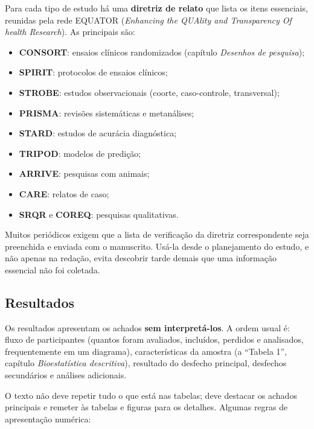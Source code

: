 \documentclass[
]{book}
\providecommand{\tightlist}{%
  \setlength{\itemsep}{0pt}\setlength{\parskip}{0pt}}
\begin{document}
Para cada tipo de estudo há uma \textbf{diretriz de relato} que lista os itens essenciais, reunidas pela rede EQUATOR (\emph{Enhancing the QUAlity and Transparency Of health Research}). As principais são:

\begin{itemize}
\tightlist
\item
  \textbf{CONSORT}: ensaios clínicos randomizados (capítulo \emph{Desenhos de pesquisa});
\item
  \textbf{SPIRIT}: protocolos de ensaios clínicos;
\item
  \textbf{STROBE}: estudos observacionais (coorte, caso-controle, transversal);
\item
  \textbf{PRISMA}: revisões sistemáticas e metanálises;
\item
  \textbf{STARD}: estudos de acurácia diagnóstica;
\item
  \textbf{TRIPOD}: modelos de predição;
\item
  \textbf{ARRIVE}: pesquisas com animais;
\item
  \textbf{CARE}: relatos de caso;
\item
  \textbf{SRQR} e \textbf{COREQ}: pesquisas qualitativas.
\end{itemize}

Muitos periódicos exigem que a lista de verificação da diretriz correspondente seja preenchida e enviada com o manuscrito. Usá-la desde o planejamento do estudo, e não apenas na redação, evita descobrir tarde demais que uma informação essencial não foi coletada.

\subsection{Resultados}\label{resultados}

Os resultados apresentam os achados \textbf{sem interpretá-los}. A ordem usual é: fluxo de participantes (quantos foram avaliados, incluídos, perdidos e analisados, frequentemente em um diagrama), características da amostra (a ``Tabela 1'', capítulo \emph{Bioestatística descritiva}), resultado do desfecho principal, desfechos secundários e análises adicionais.

O texto não deve repetir tudo o que está nas tabelas; deve destacar os achados principais e remeter às tabelas e figuras para os detalhes. Algumas regras de apresentação numérica:
\end{document}
